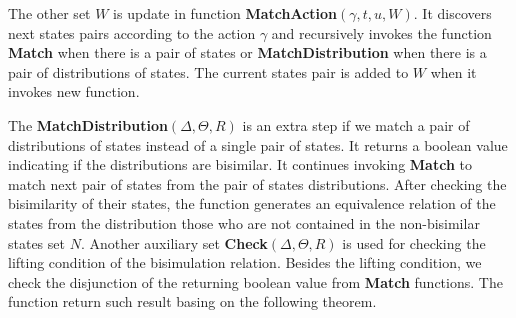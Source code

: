 \documentclass[runningheads]{llncs}
\begin{document}
The other set $W$ is update in function \textbf{MatchAction}$(\gamma,t,u,W)$. It discovers next states pairs according to the action $\gamma$ and recursively invokes the function \textbf{Match} when there is a pair of states or \textbf{MatchDistribution} when there is a pair of distributions of states. The current states pair is added to $W$ when it invokes new function.

The \textbf{MatchDistribution}$(\Delta,\Theta,\textit{R})$ is an extra step if we match a pair of distributions of states instead of a single pair of states. It returns a boolean value indicating if the distributions are bisimilar. It continues invoking \textbf{Match} to match next pair of states from the pair of states distributions. After checking the bisimilarity of their states, the function generates an equivalence relation of the states from the distribution those who are not contained in the non-bisimilar states set $N$. Another auxiliary set \textbf{Check}$(\Delta,\Theta,\textit{R})$ is used for checking the lifting condition of the bisimulation relation. Besides the lifting condition, we check the disjunction of the returning boolean value from \textbf{Match} functions. The function return such result basing on the following theorem.
\end{document}
